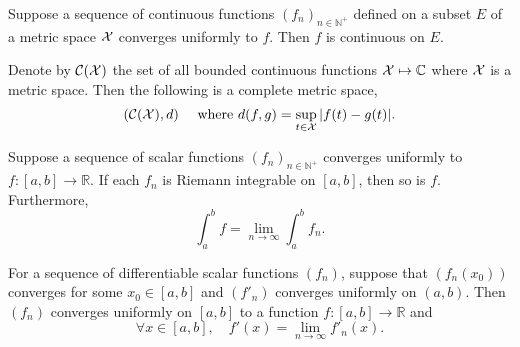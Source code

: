 \begin{coro}
  \label{coro:uniformLimitIsCont}
  Suppose a sequence of continuous functions $(f_n)_{n\in\mathbb{N}^+}$ 
  defined on a subset $E$ of a metric space ${\cal X}$
  converges uniformly to $f$.
  Then $f$ is continuous on $E$.
\end{coro}

\begin{coro}
  \label{coro:CXisComplete}
  Denote by ${\cal C}({\cal X})$
  the set of all bounded continuous functions
  ${\cal X}\mapsto \mathbb{C}$
  where ${\cal X}$ is a metric space.
  Then the following is a complete metric space,
  \begin{equation}
    \label{eq:CXcomplete}
    ({\cal C}({\cal X}),d)\quad \text{ where }
    d(f,g)=\sup_{t\in {\cal X}}|f(t)-g(t)|. 
  \end{equation}
\end{coro}

\begin{thm}
  \label{thm:uniformConvAndIntegral}
  Suppose a sequence of scalar functions $(f_n)_{n\in\mathbb{N}^+}$
  converges uniformly to $f:[a,b]\rightarrow \mathbb{R}$.
  If each $f_n$ is Riemann integrable on $[a,b]$,
  then so is $f$. Furthermore, 
  \begin{equation}
    \label{eq:uniformConvAndIntegral}
    \int_a^bf = \lim_{n\rightarrow \infty} \int_a^bf_n. 
  \end{equation}
\end{thm}

\begin{thm}
  \label{thm:uniformConvergenceOfDerivatives}
  For a sequence of differentiable scalar functions $(f_n)$, 
  suppose that $(f_n(x_0))$ converges for some $x_0\in[a,b]$
  and $(f'_n)$ converges uniformly on $(a,b)$. 
  Then $(f_n)$ converges uniformly on $[a,b]$
  to a function $f: [a,b]\rightarrow \mathbb{R}$
  and
  \begin{equation}
    \label{eq:uniformConvergenceOfDerivatives}
    \forall x\in [a,b], \quad
    f'(x) = \lim_{n\rightarrow \infty} f'_n(x).
  \end{equation}
\end{thm}

